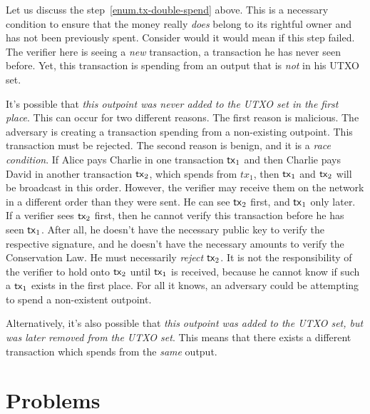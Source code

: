 Let us discuss the step~\ref{enum.tx-double-spend} above.
This is a necessary condition to ensure that the money really \emph{does} belong to its rightful owner and
has not been previously spent.
Consider would it would mean if this step failed.
The verifier here is seeing a \emph{new} transaction, a transaction he has never seen before.
Yet, this transaction is spending from an output that is \emph{not} in his UTXO set.

It's possible that \emph{this outpoint was never added to the UTXO set in the first place}.
This can occur for two different reasons.
The first reason is malicious. The adversary is creating a transaction spending from
a non-existing outpoint. This transaction must be rejected.
The second reason is benign, and it is a \emph{race condition}.
If Alice pays Charlie in one transaction $\mathsf{tx}_1$ and then Charlie pays David in another
transaction $\mathsf{tx}_2$, which spends from $tx_1$, then $\mathsf{tx}_1$ and $\mathsf{tx}_2$ will be broadcast
in this order. However, the verifier may receive them on the network
in a different order than they were sent. He can see $\mathsf{tx}_2$ first, and $\mathsf{tx}_1$ only later.
If a verifier sees $\mathsf{tx}_2$ first, then
he cannot verify this transaction before he has seen $\mathsf{tx}_1$. After all, he doesn't have
the necessary public key to verify the respective signature, and he doesn't have the
necessary amounts to verify the Conservation Law.
He must necessarily \emph{reject}
$\mathsf{tx}_2$. It is not
the responsibility of the verifier to hold onto $\mathsf{tx}_2$ until $\mathsf{tx}_1$ is received,
because he cannot know if such a $\mathsf{tx}_1$ exists in the first place. For all it knows,
an adversary could be attempting to spend a non-existent outpoint.

Alternatively, it's also possible that \emph{this outpoint was added to the UTXO set, but was later
removed from the UTXO set}. This means that there exists a different transaction
which spends from the \emph{same} output.

\section*{Problems}


